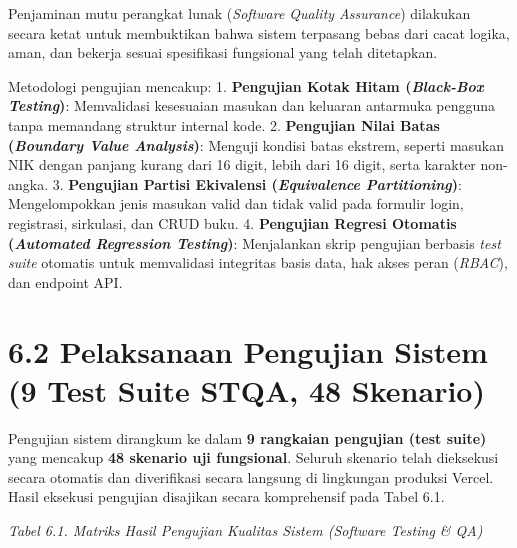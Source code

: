 \documentclass[
  indonesian,
  12pt,
]{report}
\begin{document}
Penjaminan mutu perangkat lunak (\emph{Software Quality Assurance})
dilakukan secara ketat untuk membuktikan bahwa sistem terpasang bebas
dari cacat logika, aman, dan bekerja sesuai spesifikasi fungsional yang
telah ditetapkan.

Metodologi pengujian mencakup: 1. \textbf{Pengujian Kotak Hitam
(\emph{Black-Box Testing})}: Memvalidasi kesesuaian masukan dan keluaran
antarmuka pengguna tanpa memandang struktur internal kode. 2.
\textbf{Pengujian Nilai Batas (\emph{Boundary Value Analysis})}: Menguji
kondisi batas ekstrem, seperti masukan NIK dengan panjang kurang dari 16
digit, lebih dari 16 digit, serta karakter non-angka. 3.
\textbf{Pengujian Partisi Ekivalensi (\emph{Equivalence Partitioning})}:
Mengelompokkan jenis masukan valid dan tidak valid pada formulir login,
registrasi, sirkulasi, dan CRUD buku. 4. \textbf{Pengujian Regresi
Otomatis (\emph{Automated Regression Testing})}: Menjalankan skrip
pengujian berbasis \emph{test suite} otomatis untuk memvalidasi
integritas basis data, hak akses peran (\emph{RBAC}), dan endpoint API.

\section{6.2 Pelaksanaan Pengujian Sistem (9 Test Suite STQA, 48
Skenario)}\label{pelaksanaan-pengujian-sistem-9-test-suite-stqa-48-skenario}

Pengujian sistem dirangkum ke dalam \textbf{9 rangkaian pengujian (test
suite)} yang mencakup \textbf{48 skenario uji fungsional}. Seluruh
skenario telah dieksekusi secara otomatis dan diverifikasi secara
langsung di lingkungan produksi Vercel. Hasil eksekusi pengujian
disajikan secara komprehensif pada Tabel 6.1.

\emph{Tabel 6.1. Matriks Hasil Pengujian Kualitas Sistem (Software
Testing \& QA)}
\end{document}
